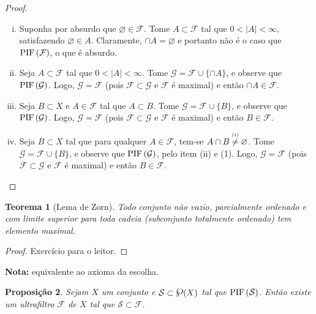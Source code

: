 \documentclass{article}
\newtheorem{theorem}{Teorema}
\newtheorem{proposition}[theorem]{Proposição}
\newcommand{\comment}[2]{\stackrel{\mathclap{\textnormal{\tiny\mbox{#2}}}}{#1}}
\newcommand{\powerset}{\raisebox{.15\baselineskip}{\Large\ensuremath{\wp}}}
\newcommand{\fip}[1]{\text{PIF\,}(#1)}
\begin{document}
\begin{proof}
  \begin{enumerate}[(i)]
  \item Suponha por absurdo que \(\varnothing \in \mathcal{F}\).  Tome
    \(A \subset \mathcal{F}\) tal que \(0 < |A| < \infty\),
    satisfazendo \(\varnothing \in A\).  Claramente, \(\cap A =
    \varnothing\) e portanto não é o caso que \(\fip{\mathcal{F}}\), o
    que é absurdo.

  \item Seja \(A \subset \mathcal{F}\) tal que \(0 < |A| < \infty\).
    Tome \(\mathcal{G} = \mathcal{F} \cup \{\cap A\}\), e observe que
    \(\fip{\mathcal{G}}\).  Logo, \(\mathcal{G} = \mathcal{F}\) (pois
    \(\mathcal{F} \subset \mathcal{G}\) e \(\mathcal{F}\) é maximal) e
    então \(\cap A \in \mathcal{F}\).

  \item Seja \(B \subset X\) e \(A \in \mathcal{F}\) tal que \(A
    \subset B\).  Tome \(\mathcal{G} = \mathcal{F} \cup \{B\}\), e
    observe que \(\fip{\mathcal{G}}\).  Logo, \(\mathcal{G} =
    \mathcal{F}\) (pois \(\mathcal{F} \subset \mathcal{G}\) e
    \(\mathcal{F}\) é maximal) e então \(B \in \mathcal{F}\).

  \item Seja \(B \subset X\) tal que para qualquer \(A \in
    \mathcal{F}\), tem-se \(A\cap B \comment{\neq}{(1)} \varnothing\).
    Tome \(\mathcal{G} = \mathcal{F} \cup \{B\}\), e observe que
    \(\fip{\mathcal{G}}\), pelo item (ii) e (1).  Logo, \(\mathcal{G}
    = \mathcal{F}\) (pois \(\mathcal{F} \subset \mathcal{G}\) e
    \(\mathcal{F}\) é maximal) e então \(B \in \mathcal{F}\).
  \end{enumerate}
\end{proof}

\begin{theorem}[Lema de Zorn]
  Todo conjunto não vazio, parcialmente ordenado e com limite superior
  para toda cadeia (subconjunto totalmente ordenado) tem elemento
  maximal.
\end{theorem}

\begin{proof}
  Exercício para o leitor.
\end{proof}

\vspace{0.5em}\noindent\textbf{Nota:} equivalente ao axioma da escolha.

\begin{proposition}\label{uf_exist}
  Sejam \(X\) um conjunto e \(\mathcal{S} \subset \powerset(X)\) tal
  que \(\fip{\mathcal{S}}\).  Então existe um ultrafiltro \(\mathcal{F}\) de
  \(X\) tal que \(\mathcal{S} \subset \mathcal{F}\).
\end{proposition}
\end{document}
